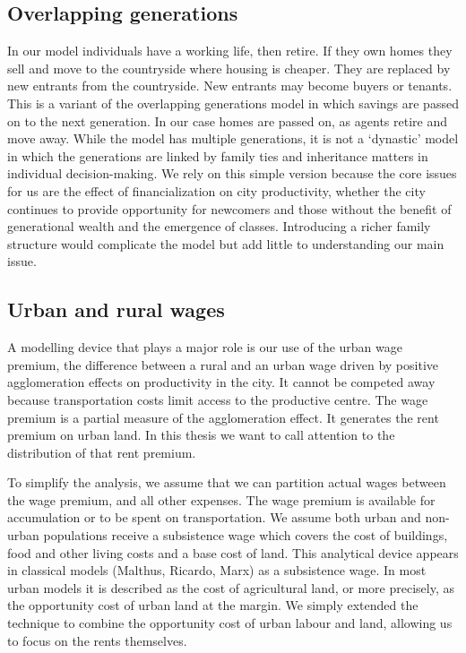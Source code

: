 \subsection{Overlapping generations}
In our model individuals have a working life, then retire. If they own homes they sell and move to the countryside where housing is cheaper. They are replaced by new entrants from the countryside. New entrants may become buyers or tenants. This is a variant of the \gls{overlapping generations}  model in which savings are passed on to the next generation. In our case homes are passed on, as agents retire and move away. While the model has multiple generations, it is not a `dynastic' model in which the generations are linked by family ties and inheritance matters in individual decision-making. We rely on this simple version because the core issues for us are  the effect of financialization on city productivity, whether the city continues to provide opportunity for newcomers and those without the benefit of generational wealth and the emergence of classes. Introducing a richer family structure would complicate the model but add little to understanding  our  main  issue. 

\subsection{Urban and rural wages}
A modelling device that plays a major role is our use of the \gls{urban wage premium}, the difference between a rural and an urban wage driven by positive \gls{agglomeration effect}s on productivity in the city. It cannot be competed away because transportation costs limit access to the productive centre. The wage premium is a partial measure of the agglomeration effect. It generates the \gls{rent premium} on urban land. In this thesis we want to call attention to the distribution of that rent premium.

To simplify the analysis, we assume that we can partition actual wages between the wage premium,  and all other expenses. The wage premium  is available for accumulation or to be spent on transportation. We assume both urban and non-urban populations  receive a \gls{subsistence wage} which covers  the cost of buildings, food and other living costs and a base cost of land. This analytical device appears in classical models (Malthus, Ricardo, Marx) as a subsistence wage. In most urban models it is described as the cost of agricultural land, or more precisely,  as the opportunity cost of urban land at the margin. We simply extended the technique to combine the opportunity cost of urban labour and land, allowing us to focus on the rents themselves. 


